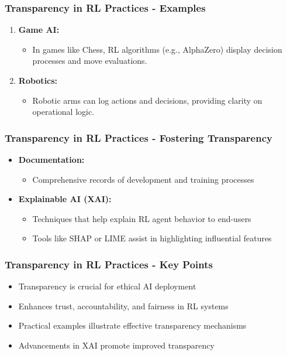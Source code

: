 \documentclass[aspectratio=169]{beamer}
\begin{document}
\begin{frame}[fragile]
    \frametitle{Transparency in RL Practices - Examples}
    \begin{enumerate}
        \item \textbf{Game AI:} 
        \begin{itemize}
            \item In games like Chess, RL algorithms (e.g., AlphaZero) display decision processes and move evaluations.
        \end{itemize}
        
        \item \textbf{Robotics:} 
        \begin{itemize}
            \item Robotic arms can log actions and decisions, providing clarity on operational logic.
        \end{itemize}
    \end{enumerate}
\end{frame}

\begin{frame}[fragile]
    \frametitle{Transparency in RL Practices - Fostering Transparency}
    \begin{itemize}
        \item \textbf{Documentation:} 
        \begin{itemize}
            \item Comprehensive records of development and training processes
        \end{itemize}
        
        \item \textbf{Explainable AI (XAI):} 
        \begin{itemize}
            \item Techniques that help explain RL agent behavior to end-users
            \item Tools like SHAP or LIME assist in highlighting influential features
        \end{itemize}
    \end{itemize}
\end{frame}

\begin{frame}[fragile]
    \frametitle{Transparency in RL Practices - Key Points}
    \begin{itemize}
        \item Transparency is crucial for ethical AI deployment
        \item Enhances trust, accountability, and fairness in RL systems
        \item Practical examples illustrate effective transparency mechanisms
        \item Advancements in XAI promote improved transparency
    \end{itemize}
\end{frame}
\end{document}
